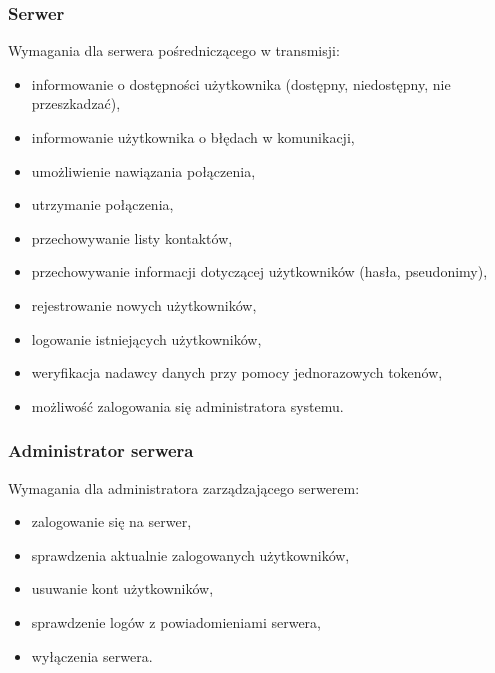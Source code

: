\documentclass[12pt,a4paper]{article}
\begin{document}
	\subsubsection{Serwer}
	\par Wymagania dla serwera pośredniczącego w transmisji:
	\begin{itemize}
		\item informowanie o dostępności użytkownika (dostępny, niedostępny, nie przeszkadzać),
		\item informowanie użytkownika o błędach w komunikacji,
		\item umożliwienie nawiązania połączenia, 
		\item utrzymanie połączenia, 
		\item przechowywanie listy kontaktów, 
		\item przechowywanie informacji dotyczącej użytkowników (hasła, pseudonimy),
		\item rejestrowanie nowych użytkowników,
		\item logowanie istniejących użytkowników,
		\item weryfikacja nadawcy danych przy pomocy jednorazowych tokenów,
		\item możliwość zalogowania się administratora systemu.
	\end{itemize}
	
	\subsubsection{Administrator serwera}
	\par Wymagania dla administratora zarządzającego serwerem:
	\begin{itemize}
		\item zalogowanie się na serwer,
		\item sprawdzenia aktualnie zalogowanych użytkowników,
		\item usuwanie kont użytkowników,
		\item sprawdzenie logów z powiadomieniami serwera,
		\item wyłączenia serwera.
	\end{itemize}
	
\end{document}
